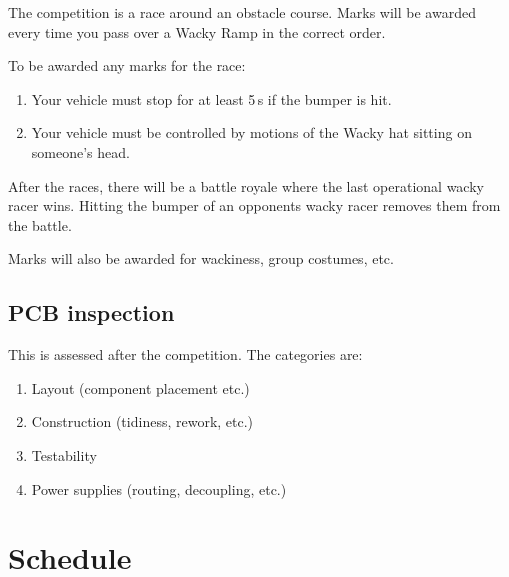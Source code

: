 \documentclass[11pt, a4paper]{article}
\begin{document}
The competition is a race around an obstacle course.  Marks will be
awarded every time you pass over a Wacky Ramp in the correct order.


To be awarded any marks for the race:
%
\begin{enumerate}
\item Your vehicle must stop for at least 5\,s if the bumper is hit.

\item Your vehicle must be controlled by motions of the Wacky hat
  sitting on someone's head.
\end{enumerate}

After the races, there will be a battle royale where the last
operational wacky racer wins.  Hitting the bumper of an opponents
wacky racer removes them from the battle.

Marks will also be awarded for wackiness, group costumes, etc.




\subsection{PCB inspection}

This is assessed after the competition.  The categories are:
%
\begin{enumerate}
\item Layout (component placement etc.)
\item Construction (tidiness, rework, etc.)
\item Testability
\item Power supplies (routing, decoupling, etc.)
\end{enumerate}


\vfill\pagebreak
\section{Schedule}
\end{document}

